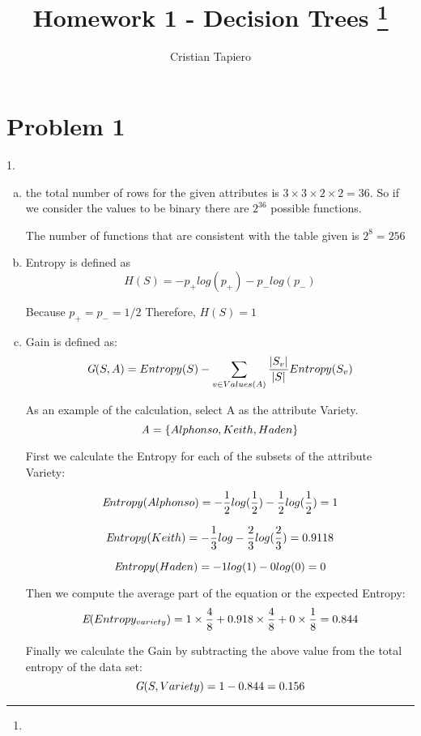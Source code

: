 \documentclass[11pt]{article}
\title{Homework 1 - Decision Trees
	\footnote{\s{CS 6350 Machine Learning; \;\; Spring 2024 \hfill
			Instructor: Vivek Kumar, University of Utah}
	}
}
\author{Cristian Tapiero}
\begin{document}
	\maketitle
	
	
	
	
	
	\section{Problem 1}
	1.
	\begin{enumerate}[(a)] %
		\item the total number of rows for the given attributes is $3\times3\times2\times2 = 36.$  
		So if we consider the values to be binary  there are $2^{36}$ possible functions.
		
		The number of functions that are consistent with the table given is $2^{8} = 256$
		
		\item Entropy is defined as $$H(S) =-p_+ log (p_+)-p_- log(p_-)$$
		
		Because $p_+ = p_- = 1/2$ Therefore, $H(S) = 1$
		
		\item Gain is defined as: $$\textit G(S,A) = Entropy(S) - \sum_{v\in Values(A)} \frac{|S_v|}{|S|} Entropy(S_v)$$ 
		
		As an example of the calculation, select A as the attribute Variety.
		$$\textit A = \{Alphonso,Keith,Haden\}$$
		
		First we calculate the Entropy for each of the subsets of the attribute Variety:
		
		$$\textit Entropy(Alphonso) = - \frac{1}{2}log(\frac{1}{2}) - \frac{1}{2}  log(\frac{1}{2}) = 1$$
		
		$$\textit Entropy(Keith) = -\frac{1}{3}log -\frac{2}{3} log(\frac{2}{3}) = 0.9118$$
		
		$$\textit Entropy(Haden) = -1log(1) - 0 log(0) = 0$$
		
		Then we compute the average part of the equation or the expected Entropy:
		$$\textit E(Entropy_{variety}) = 1 \times \frac{4}{8} + 0.918\times \frac{4}{8} + 0 \times \frac{1}{8} = 0.844$$
		
		Finally we calculate the Gain by subtracting the above value from the total entropy of the data set:
		$$\textit G(S,Variety) =  1 - 0.844 = 0.156 $$
		

\end{enumerate}
\end{document}
